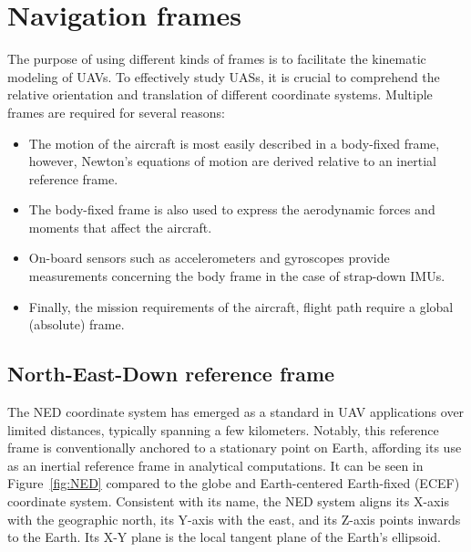 \section{Navigation frames}

 The purpose of using different kinds of frames is to facilitate the kinematic modeling of UAVs. To effectively study UASs, it is crucial to comprehend the relative orientation and translation of different coordinate systems. Multiple frames are required for several reasons:
\begin{itemize}
    \item 
    The motion of the aircraft is most easily described in a body-fixed frame, however, Newton's equations of motion are derived relative to an inertial reference frame.
    \item 
    The body-fixed frame is also used to express the aerodynamic forces and moments that affect the aircraft.
    \item
    On-board sensors such as accelerometers and gyroscopes provide measurements concerning the body frame in the case of strap-down IMUs.
    \item 
    Finally, the mission requirements of the aircraft, \eg{} flight path require a global (absolute) frame.
\end{itemize}

\subsection{North-East-Down reference frame}

The NED coordinate system has emerged as a standard in UAV applications over limited distances, typically spanning a few kilometers. Notably, this reference frame is conventionally anchored to a stationary point on Earth, affording its use as an inertial reference frame in analytical computations. It can be seen in Figure~\ref{fig:NED} compared to the globe and Earth-centered Earth-fixed (ECEF) coordinate system. Consistent with its name, the NED system aligns its X-axis with the geographic north, its Y-axis with the east, and its Z-axis points inwards to the Earth. Its X-Y plane is the local tangent plane of the Earth's ellipsoid.

